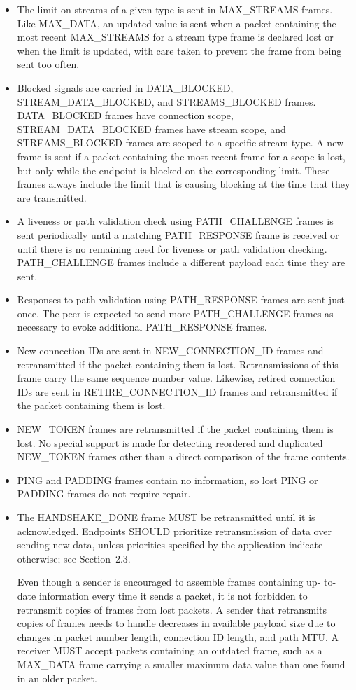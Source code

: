\documentclass{article}
\begin{document}
\begin{itemize}
\item The limit on streams of a given type is sent in MAX\_STREAMS frames.  Like MAX\_DATA, an updated value is sent when a packet containing the most recent MAX\_STREAMS for a stream type frame is declared lost or when the limit is updated, with care taken to prevent the frame from being sent too often.
\item Blocked signals are carried in DATA\_BLOCKED, STREAM\_DATA\_BLOCKED, and STREAMS\_BLOCKED frames.  DATA\_BLOCKED frames have connection scope, STREAM\_DATA\_BLOCKED frames have stream scope, and STREAMS\_BLOCKED frames are scoped to a specific stream type.  A new frame is sent if a packet containing the most recent frame for a scope is lost, but only while the endpoint is blocked on the corresponding limit.  These frames always include the limit that is causing blocking at the time that they are transmitted.
\item A liveness or path validation check using PATH\_CHALLENGE frames is sent periodically until a matching PATH\_RESPONSE frame is received or until there is no remaining need for liveness or path validation checking.  PATH\_CHALLENGE frames include a different payload each time they are sent.
\item Responses to path validation using PATH\_RESPONSE frames are sent just once.  The peer is expected to send more PATH\_CHALLENGE frames as necessary to evoke additional PATH\_RESPONSE frames.
\item New connection IDs are sent in NEW\_CONNECTION\_ID frames and retransmitted if the packet containing them is lost. Retransmissions of this frame carry the same sequence number value.  Likewise, retired connection IDs are sent in RETIRE\_CONNECTION\_ID frames and retransmitted if the packet containing them is lost.
\item NEW\_TOKEN frames are retransmitted if the packet containing them is lost.  No special support is made for detecting reordered and duplicated NEW\_TOKEN frames other than a direct comparison of the frame contents.
\item PING and PADDING frames contain no information, so lost PING or PADDING frames do not require repair.
\item The HANDSHAKE\_DONE frame MUST be retransmitted until it is acknowledged.
Endpoints SHOULD prioritize retransmission of data over sending new data, unless priorities specified by the application indicate otherwise; see Section~2.3.

Even though a sender is encouraged to assemble frames containing up- to-date information every time it sends a packet, it is not forbidden to retransmit copies of frames from lost packets.  A sender that retransmits copies of frames needs to handle decreases in available payload size due to changes in packet number length, connection ID length, and path MTU.  A receiver MUST accept packets containing an outdated frame, such as a MAX\_DATA frame carrying a smaller maximum data value than one found in an older packet.


\end{itemize}
\end{document}

